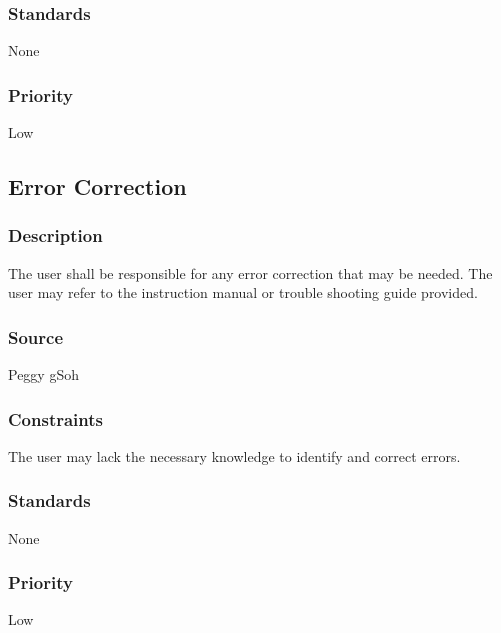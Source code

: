 \subsubsection{Standards}
None
\subsubsection{Priority}
Low

\subsection{Error Correction}
\subsubsection{Description}
The user shall be responsible for any error correction that may be needed. The user may refer to the instruction manual or trouble shooting guide provided.
\subsubsection{Source}
Peggy gSoh
\subsubsection{Constraints}
The user may lack the necessary knowledge to identify and correct errors.
\subsubsection{Standards}
None
\subsubsection{Priority}
Low
